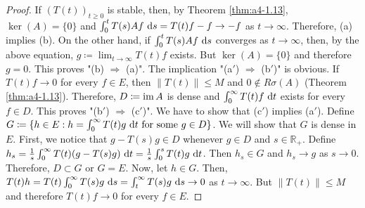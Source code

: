 \begin{proof}
If $(T(t))_{t \geq 0}$ is stable, then, by Theorem \ref{thm:a4-1.13}, $\ker(A) = \{0\}$ and
$\int_{0}^{t} T(s)Af \,\mathop{}\!\mathrm{d}{s} = T(t)f - f \to -f$ as $t \to \infty$. 
Therefore, (a) implies (b).
On the other hand, if $\int_{0}^{t} T(s)Af \,\mathop{}\!\mathrm{d}{s}$ converges as $t \to \infty$, then, by
the above equation, $g \coloneqq \lim_{t \to \infty} T(t)f$ exists. 
But $\ker(A) = \{0\}$ and
therefore $g = 0$. 
This proves "(b) $\Rightarrow$ (a)".
The implication "(a$'$) $\Rightarrow$ (b$'$)" is obvious. 
If $T(t)f \to 0$ for every $f \in E$, then $\|T(t)\| \leq M$ and $0 \not\in R\sigma(A)$ (Theorem \ref{thm:a4-1.13}). 
Therefore,
$D \coloneqq \mathop{}\!\mathrm{im}\, A$ is dense and $\int_{0}^{\infty} T(t)f \,\mathop{}\!\mathrm{d}{t}$ exists for every $f \in D$. 
This proves "(b$'$) $\Rightarrow$ (c$'$)". 
We have to show that (c$'$) implies (a$'$).
Define $G \coloneqq \{h \in E : h = \int_{0}^{\infty} T(t)g \,\mathop{}\!\mathrm{d}{t} \text{ for some } g \in D\}$. 
We will show
that $G$ is dense in $E$. 
First, we notice that $g - T(s)g \in D$ whenever $g \in D$
and $s \in \mathbb{R}_{+}$.
Define $h_{s} = \frac{1}{s} \int_{0}^{\infty} T(t)(g - T(s)g) \,\mathop{}\!\mathrm{d}{t} = \frac{1}{s} \int_{0}^{s} T(t)g \,\mathop{}\!\mathrm{d}{t}$. 
Then $h_{s} \in G$
and $h_{s} \to g$ as $s \to 0$. 
Therefore, $D \subset G$ or $G = E$. 
Now, let $h \in G$.
Then, $T(t)h = T(t) \int_{0}^{\infty} T(s)g \,\mathop{}\!\mathrm{d}{s} = \int_{t}^{\infty} T(s)g \,\mathop{}\!\mathrm{d}{s} \to 0$ as $t \to \infty$. 
But $\|T(t)\| \leq M$ and therefore $T(t)f \to 0$ for every $f \in E$.
\end{proof}

